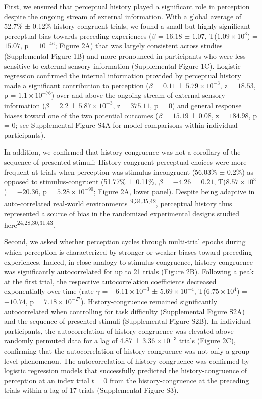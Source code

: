 \documentclass[
]{article}
\begin{document}
First, we ensured that perceptual history played a significant role in
perception despite the ongoing stream of external information. With a
global average of 52.7\% ± 0.12\% history-congruent trials, we found a
small but highly significant perceptual bias towards preceding
experiences (\(\beta\) = \(16.18\) ± \(1.07\),
T(\(\ensuremath{1.09\times 10^{3}}\)) = \(15.07\), p =
\(\ensuremath{10^{-46}}\); Figure 2A) that was largely consistent across
studies (Supplemental Figure 1B) and more pronounced in participants who
were less sensitive to external sensory information (Supplemental Figure
1C). Logistic regression confirmed the internal information provided by
perceptual history made a significant contribution to perception
(\(\beta\) = \(0.11\) ± \(\ensuremath{5.79\times 10^{-3}}\), z =
\(18.53\), p = \(\ensuremath{1.1\times 10^{-76}}\)) over and above the
ongoing stream of external sensory information (\(\beta\) = \(2.2\) ±
\(\ensuremath{5.87\times 10^{-3}}\), z = \(375.11\), p = \(0\)) and
general response biases toward one of the two potential outcomes
(\(\beta\) = \(15.19\) ± \(0.08\), z = \(184.98\), p = \(0\); see
Supplemental Figure S4A for model comparisons within individual
participants).

In addition, we confirmed that history-congruence was not a corollary of
the sequence of presented stimuli: History-congruent perceptual choices
were more frequent at trials when perception was stimulus-incongruent
(56.03\% ± 0.2\%) as opposed to stimulus-congruent (51.77\% ± 0.11\%,
\(\beta\) = \(-4.26\) ± \(0.21\), T(\(\ensuremath{8.57\times 10^{3}}\))
= \(-20.36\), p = \(\ensuremath{5.28\times 10^{-90}}\); Figure 2A, lower
panel). Despite being adaptive in auto-correlated real-world
environments\textsuperscript{19,34,35,42}, perceptual history thus
represented a source of bias in the randomized experimental designs
studied here\textsuperscript{24,28,30,31,43}.

Second, we asked whether perception cycles through multi-trial epochs
during which perception is characterized by stronger or weaker biases
toward preceding experiences. Indeed, in close analogy to
stimulus-congruence, history-congruence was significantly autocorrelated
for up to 21 trials (Figure 2B). Following a peak at the first trial,
the respective autocorrelation coefficients decreased exponentially over
time (rate \(\gamma\) = \(\ensuremath{-6.11\times 10^{-3}}\) ±
\(\ensuremath{5.69\times 10^{-4}}\),
T(\(\ensuremath{6.75\times 10^{4}}\)) = \(-10.74\), p =
\(\ensuremath{7.18\times 10^{-27}}\)). History-congruence remained
significantly autocorrelated when controlling for task difficulty
(Supplemental Figure S2A) and the sequence of presented stimuli
(Supplemental Figure S2B). In individual participants, the
autocorrelation of history-congruence was elevated above randomly
permuted data for a lag of 4.87 ± \ensuremath{3.36\times 10^{-3}} trials
(Figure 2C), confirming that the autocorrelation of history-congruence
was not only a group-level phenomenon. The autocorrelation of
history-congruence was confirmed by logistic regression models that
successfully predicted the history-congruence of perception at an index
trial \(t = 0\) from the history-congruence at the preceding trials
within a lag of 17 trials (Supplemental Figure S3).
\end{document}
